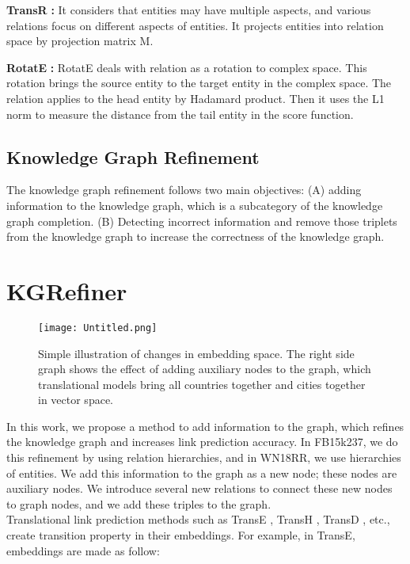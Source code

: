 \documentclass{article} \usepackage{iclr2022_conference,times}
\begin{document}
\noindent \textbf{TransR} \citep{lin2015learning} \textbf{:}
It considers that entities may have multiple aspects, and various relations focus on different aspects of entities. It projects entities into relation space by projection matrix M.

\noindent \textbf{RotatE} \citep{rotate} \textbf{:}
RotatE deals with relation as a rotation to complex space. This rotation brings the source entity to the target entity in the complex space. The relation applies to the head entity by  Hadamard product. Then it uses the L1 norm to measure the distance from the tail entity in the score function.



\subsection{Knowledge Graph Refinement}
The knowledge graph refinement follows two main objectives: (A) adding information to the knowledge graph, which is a subcategory of the knowledge graph completion. (B) Detecting incorrect information and remove those triplets from the knowledge graph to increase the correctness of the knowledge graph.




\section{KGRefiner}
\label{headings}
\begin{figure*}[ht!]
	\centering
			\texttt{[image: Untitled.png]}
		\label{fig:verticalcell}
		\caption{Simple illustration of changes in embedding space. The right side graph shows the effect of adding auxiliary nodes to the graph, which translational models bring all countries together and cities together in vector space.}
\end{figure*}
In this work, we propose a method to add information to the graph, which refines the knowledge graph and increases link prediction accuracy. In FB15k237,  we do this refinement by using relation hierarchies, and in WN18RR, we use hierarchies of entities. We add this information to the graph as a new node; these nodes are auxiliary nodes. We introduce several new relations to connect these new nodes to graph nodes, and we add these triples to the graph.\\ 
Translational link prediction methods such as TransE \citep{bordes2013translating}, TransH \citep{transh}, TransD \citep{ji2015knowledge}, etc., create transition property in their embeddings. For example, in TransE, embeddings are made as follow: 
\end{document}
